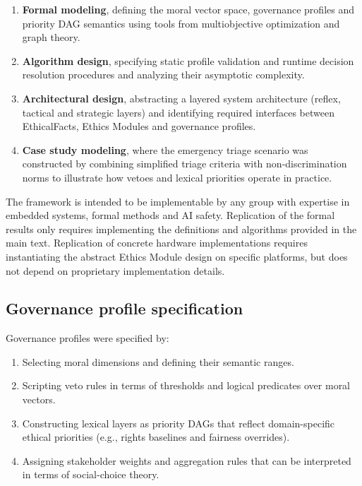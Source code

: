 \documentclass[11pt]{article}
\begin{document}
\begin{enumerate}
  \item \textbf{Formal modeling}, defining the moral vector space, governance profiles and priority DAG semantics using tools from multiobjective optimization and graph theory.
  \item \textbf{Algorithm design}, specifying static profile validation and runtime decision resolution procedures and analyzing their asymptotic complexity.
  \item \textbf{Architectural design}, abstracting a layered system architecture (reflex, tactical and strategic layers) and identifying required interfaces between EthicalFacts, Ethics Modules and governance profiles.
  \item \textbf{Case study modeling}, where the emergency triage scenario was constructed by combining simplified triage criteria with non-discrimination norms to illustrate how vetoes and lexical priorities operate in practice.
\end{enumerate}

The framework is intended to be implementable by any group with expertise in embedded systems, formal methods and AI safety. Replication of the formal results only requires implementing the definitions and algorithms provided in the main text. Replication of concrete hardware implementations requires instantiating the abstract Ethics Module design on specific platforms, but does not depend on proprietary implementation details.

\subsection*{Governance profile specification}

Governance profiles were specified by:

\begin{enumerate}
  \item Selecting moral dimensions and defining their semantic ranges.
  \item Scripting veto rules in terms of thresholds and logical predicates over moral vectors.
  \item Constructing lexical layers as priority DAGs that reflect domain-specific ethical priorities (e.g., rights baselines and fairness overrides).
  \item Assigning stakeholder weights and aggregation rules that can be interpreted in terms of social-choice theory.
\end{enumerate}
\end{document}
